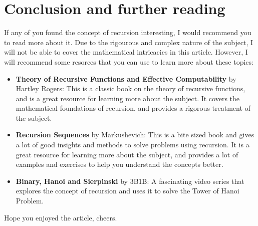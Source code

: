 \documentclass[openany]{book}
\begin{document}
\section{Conclusion and further reading}
If any of you found the concept of recursion interesting, I would recommend you to read more about it. Due to the rigourous and complex nature of the subject, I will not be able to cover the mathematical intricacies in this article. However, I will recommend some resorces that you can use to learn more about these topics:
\begin{itemize}
    \item \textbf{Theory of Recursive Functions and Effective Computability} by Hartley Rogers: This is a classic book on the theory of recursive functions, and is a great resource for learning more about the subject. It covers the mathematical foundations of recursion, and provides a rigorous treatment of the subject.
    \item \textbf{Recursion Sequences} by Markushevich: This is a bite sized book and gives a lot of good insights and methods to solve problems using recursion. It is a great resource for learning more about the subject, and provides a lot of examples and exercises to help you understand the concepts better.
    \item \textbf{Binary, Hanoi and Sierpinski} by 3B1B: A fascinating video series that explores the concept of recursion and uses it to solve the Tower of Hanoi Problem.
\end{itemize}
Hope you enjoyed the article, cheers.
\end{document}
